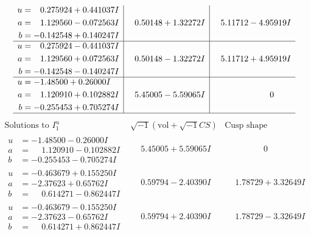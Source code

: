 \documentclass[1p]{elsarticle_modified}
\theoremstyle{definition}
\newcommand{\I}{\sqrt{-1}}
\begin{document}
$$\begin{array}{c|c|c}
\begin{aligned}
u &= \phantom{-}0.275924 + 0.441037 I \\
a &= \phantom{-}1.129560 - 0.072563 I \\
b &= -0.142548 + 0.140247 I\end{aligned}
 & \phantom{-}0.50148 + 1.32272 I & \phantom{-}5.11712 - 4.95919 I \\ \hline\begin{aligned}
u &= \phantom{-}0.275924 - 0.441037 I \\
a &= \phantom{-}1.129560 + 0.072563 I \\
b &= -0.142548 - 0.140247 I\end{aligned}
 & \phantom{-}0.50148 - 1.32272 I & \phantom{-}5.11712 + 4.95919 I \\ \hline\begin{aligned}
u &= -1.48500 + 0.26000 I \\
a &= \phantom{-}1.120910 + 0.102882 I \\
b &= -0.255453 + 0.705274 I\end{aligned}
 & \phantom{-}5.45005 - 5.59065 I & \phantom{-0.000000 } 0\\
 \hline 
 \end{array}$$\newpage$$\begin{array}{c|c|c}  
\text{Solutions to }I^u_{1}& \I (\text{vol} + \sqrt{-1}CS) & \text{Cusp shape}\\
 \hline 
\begin{aligned}
u &= -1.48500 - 0.26000 I \\
a &= \phantom{-}1.120910 - 0.102882 I \\
b &= -0.255453 - 0.705274 I\end{aligned}
 & \phantom{-}5.45005 + 5.59065 I & \phantom{-0.000000 } 0 \\ \hline\begin{aligned}
u &= -0.463679 + 0.155250 I \\
a &= -2.37623 + 0.65762 I \\
b &= \phantom{-}0.614271 - 0.862447 I\end{aligned}
 & \phantom{-}0.59794 - 2.40390 I & \phantom{-}1.78729 + 3.32649 I \\ \hline\begin{aligned}
u &= -0.463679 - 0.155250 I \\
a &= -2.37623 - 0.65762 I \\
b &= \phantom{-}0.614271 + 0.862447 I\end{aligned}
 & \phantom{-}0.59794 + 2.40390 I & \phantom{-}1.78729 - 3.32649 I \\ \hline\begin{aligned}

\end{aligned}
\end{array}$$
\end{document}
